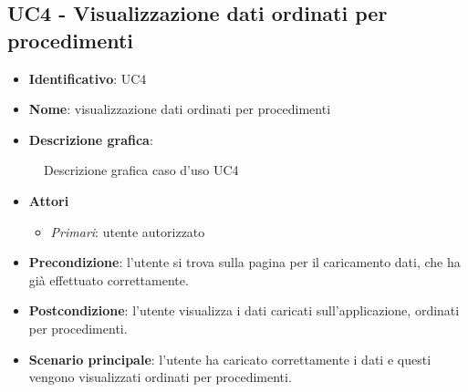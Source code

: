 
\subsection{UC4 - Visualizzazione dati ordinati per procedimenti}
\begin{itemize}
  \item \textbf{Identificativo}: UC4
  \item \textbf{Nome}: visualizzazione dati ordinati per procedimenti
  \item \textbf{Descrizione grafica}:
\end{itemize}

\begin{figure}[h]
  \centering
  \caption{Descrizione grafica caso d'uso UC4}
\end{figure}

\begin{itemize}
  \item \textbf{Attori}
        \begin{itemize}
          \item \textit{Primari}: utente autorizzato
        \end{itemize}
  \item \textbf{Precondizione}: l'utente si trova sulla pagina per il caricamento dati, che ha già effettuato correttamente.
  \item \textbf{Postcondizione}: l'utente visualizza i dati caricati sull'applicazione, ordinati per procedimenti.
  \item \textbf{Scenario principale}: l'utente ha caricato correttamente i dati e questi vengono visualizzati ordinati per procedimenti.
\end{itemize}